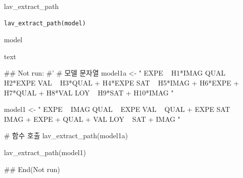 \documentclass[a4paper]{book}
\begin{document}
%
\begin{Description}
lav\_extract\_path
\end{Description}
%
\begin{Usage}
\begin{verbatim}
lav_extract_path(model)
\end{verbatim}
\end{Usage}
%
\begin{Arguments}
\begin{ldescription}
\item[\code{model}] model
\end{ldescription}
\end{Arguments}
%
\begin{Value}
text
\end{Value}
%
\begin{Examples}
\begin{ExampleCode}

\#\# Not run: 
#'
# 모델 문자열
model1a <- "
EXPE ~ H1*IMAG
QUAL ~ H2*EXPE
VAL ~ H3*QUAL + H4*EXPE
SAT ~ H5*IMAG + H6*EXPE + H7*QUAL + H8*VAL
LOY ~ H9*SAT + H10*IMAG
"

model1 <- "
EXPE ~ IMAG
QUAL ~ EXPE
VAL ~ QUAL + EXPE
SAT ~ IMAG + EXPE + QUAL + VAL
LOY ~ SAT + IMAG
"


# 함수 호출
lav_extract_path(model1a)

lav_extract_path(model1)


## End(Not run)


\end{ExampleCode}
\end{Examples}
\end{document}
